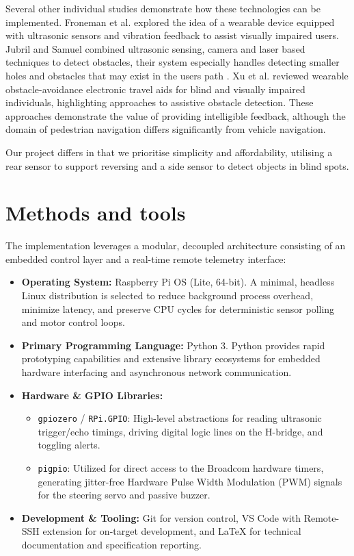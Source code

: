 \documentclass[12pt]{article}
\begin{document}
Several other individual studies demonstrate how these technologies can be implemented. Froneman et al. \cite{froneman2017development} explored the idea of a wearable device equipped with ultrasonic sensors and vibration feedback to assist visually impaired users. Jubril and Samuel combined ultrasonic sensing, camera and laser based techniques to detect obstacles, their system especially handles detecting smaller holes and obstacles that may exist in the users path \cite{jubril2021multisensor}. Xu et al. \cite{xu2023wearable} reviewed wearable obstacle-avoidance electronic travel aids for blind and visually impaired individuals, highlighting approaches to assistive obstacle detection. These approaches demonstrate the value of providing intelligible feedback, although the domain of pedestrian navigation differs significantly from vehicle navigation.

Our project differs in that we prioritise simplicity and affordability, utilising a rear sensor to support reversing and a side sensor to detect objects in blind spots.

\clearpage
\section{Methods and tools}
The implementation leverages a modular, decoupled architecture consisting of an embedded control layer and a real-time remote telemetry interface:

\begin{itemize}
    \item \textbf{Operating System:} Raspberry Pi OS (Lite, 64-bit). A minimal, headless Linux distribution is selected to reduce background process overhead, minimize latency, and preserve CPU cycles for deterministic sensor polling and motor control loops.
    \item \textbf{Primary Programming Language:} Python 3. Python provides rapid prototyping capabilities and extensive library ecosystems for embedded hardware interfacing and asynchronous network communication.
    \item \textbf{Hardware \& GPIO Libraries:}
    \begin{itemize}
        \item \texttt{gpiozero} / \texttt{RPi.GPIO}: High-level abstractions for reading ultrasonic trigger/echo timings, driving digital logic lines on the H-bridge, and toggling alerts.
        \item \texttt{pigpio}: Utilized for direct access to the Broadcom hardware timers, generating jitter-free Hardware Pulse Width Modulation (PWM) signals for the steering servo and passive buzzer.
    \end{itemize}
 
    \item \textbf{Development \& Tooling:} Git for version control, VS Code with Remote-SSH extension for on-target development, and \LaTeX{} for technical documentation and specification reporting.
\end{itemize}
\end{document}
